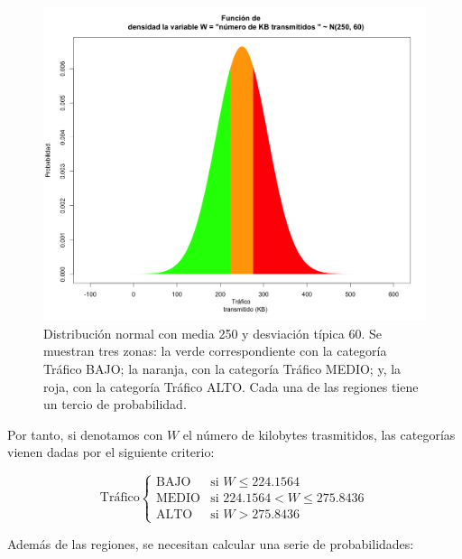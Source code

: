 \documentclass[12pt,a4paper,twoside,openright,titlepage,final]{article}
\begin{document}
\begin{figure}[htbp!]
\centering
\includegraphics[width=0.8\linewidth]{./imagenes/distribucion_normal}
\caption{Distribución normal con media 250 y desviación típica 60. Se muestran tres zonas: la verde correspondiente con la categoría Tráfico BAJO; la naranja, con la categoría Tráfico MEDIO; y, la roja, con la categoría Tráfico ALTO. Cada una de las regiones tiene un tercio de probabilidad.}
\label{fig:distribucion_normal}
\end{figure}

Por tanto, si denotamos con $W$ el número de kilobytes trasmitidos, las categorías vienen dadas por el siguiente criterio:

\[\text{Tráfico} \begin{cases}
\text{BAJO} & \text{si } W \leq 224.1564 \\
\text{MEDIO} & \text{si } 224.1564 < W \leq 275.8436 \\
\text{ALTO} & \text{si } W > 275.8436
 
\end{cases}\]

Además de las regiones, se necesitan calcular una serie de probabilidades:
\end{document}
